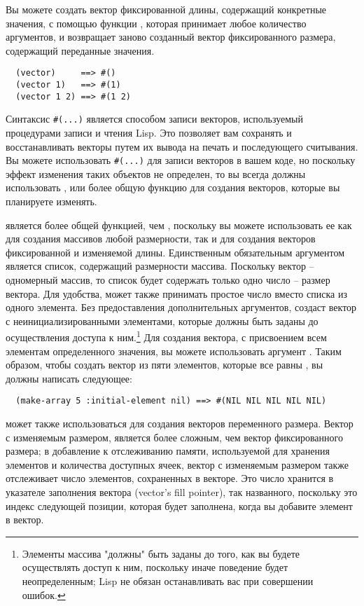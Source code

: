 Вы можете создать вектор фиксированной длины, содержащий конкретные значения, с помощью
функции , которая принимает любое количество аргументов, и возвращает заново
созданный вектор фиксированного размера, содержащий переданные значения.

\begin{verbatim}
  (vector)     ==> #()
  (vector 1)   ==> #(1)
  (vector 1 2) ==> #(1 2)
\end{verbatim}

Синтаксис \lstinline!#(...)! является способом записи векторов, используемый процедурами
записи и чтения Lisp.  Это позволяет вам сохранять и восстанавливать векторы путем их
вывода на печать и последующего считывания.  Вы можете использовать \lstinline!#(...)! для
записи векторов в вашем коде, но поскольку эффект изменения таких объектов не определен,
то вы всегда должны использовать , или более общую функцию 
для создания векторов, которые вы планируете изменять.

 является более общей функцией, чем , поскольку вы можете
использовать ее как для создания массивов любой размерности, так и для создания векторов
фиксированной и изменяемой длины. Единственным обязательным аргументом 
является список, содержащий размерности массива.  Поскольку вектор -- одномерный массив,
то список будет содержать только одно число -- размер вектора.  Для удобства,
 может также принимать простое число вместо списка из одного элемента.
Без предоставления дополнительных аргументов,  создаст вектор с
неинициализированными элементами, которые должны быть заданы до осуществления доступа к
ним.\footnote{Элементы массива "должны" быть заданы до того, как вы будете осуществлять
  доступ к ним, поскольку иначе поведение будет неопределенным; Lisp не обязан
  останавливать вас при совершении ошибок.}  Для создания вектора, с присвоением всем
элементам определенного значения, вы можете использовать аргумент .
Таким образом, чтобы создать вектор из пяти элементов, которые все равны , вы
должны написать следующее:

\begin{verbatim}
  (make-array 5 :initial-element nil) ==> #(NIL NIL NIL NIL NIL)
\end{verbatim}

 может также использоваться для создания векторов переменного размера.
Вектор с изменяемым размером, является более сложным, чем вектор фиксированного размера; в
добавление к отслеживанию памяти, используемой для хранения элементов и количества
доступных ячеек, вектор с изменяемым размером также отслеживает число элементов,
сохраненных в векторе.  Это число хранится в указателе заполнения вектора (vector's fill
pointer), так названного, поскольку это индекс следующей позиции, которая будет заполнена,
когда вы добавите элемент в вектор.

